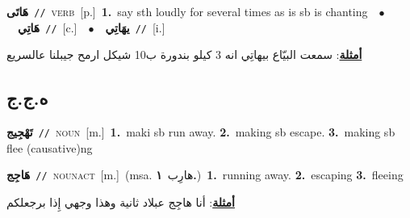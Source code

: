 \documentclass[10pt,a4paper,twoside]{article} %
\begin{document}
\begin{multicols}{2}
{\setlength\topsep{0pt}\textbf{\foreignlanguage{arabic}{هَاتَى}}\ {\color{gray}\texttt{//}\color{black}}\ \textsc{verb}\ [p.]\ \textbf{1.}~say sth loudly for several times as is sb is chanting\ \ $\bullet$\ \ \setlength\topsep{0pt}\textbf{\foreignlanguage{arabic}{هَاتِي}}\ {\color{gray}\texttt{//}\color{black}}\ [c.]\ \ $\bullet$\ \ \setlength\topsep{0pt}\textbf{\foreignlanguage{arabic}{يهَاتِي}}\ {\color{gray}\texttt{//}\color{black}}\ [i.]\  \begin{flushright}\color{gray}\foreignlanguage{arabic}{\textbf{\underline{\foreignlanguage{arabic}{أمثلة}}}: سمعت البيّاع بيهاتِي انه 3 كيلو بندورة ب10 شيكل ارمح جيبلنا عالسريع}\end{flushright}\color{black}} \vspace{2mm}

\vspace{-3mm}
\subsection*{\color{blue}\foreignlanguage{arabic}{ه.ج.ج}\color{blue}{}} 

{\setlength\topsep{0pt}\textbf{\foreignlanguage{arabic}{تَهْجِيج}}\ {\color{gray}\texttt{//}\color{black}}\ \textsc{noun}\ [m.]\ \textbf{1.}~maki sb run away.  \textbf{2.}~making sb escape.  \textbf{3.}~making sb flee (causative)ng\ } \vspace{2mm}

{\setlength\topsep{0pt}\textbf{\foreignlanguage{arabic}{هَاجِج}}\ {\color{gray}\texttt{//}\color{black}}\ \textsc{noun\textunderscore act}\ [m.]\ \color{gray}(msa. \foreignlanguage{arabic}{هارِب}~\foreignlanguage{arabic}{\textbf{١.}})\color{black}\ \textbf{1.}~running away.  \textbf{2.}~escaping  \textbf{3.}~fleeing\  \begin{flushright}\color{gray}\foreignlanguage{arabic}{\textbf{\underline{\foreignlanguage{arabic}{أمثلة}}}: أنا هاجِج عبلاد ثانية وهذا وجهي إِذا برجعلكم}\end{flushright}\color{black}} \vspace{2mm}


\end{multicols}
\end{document}
